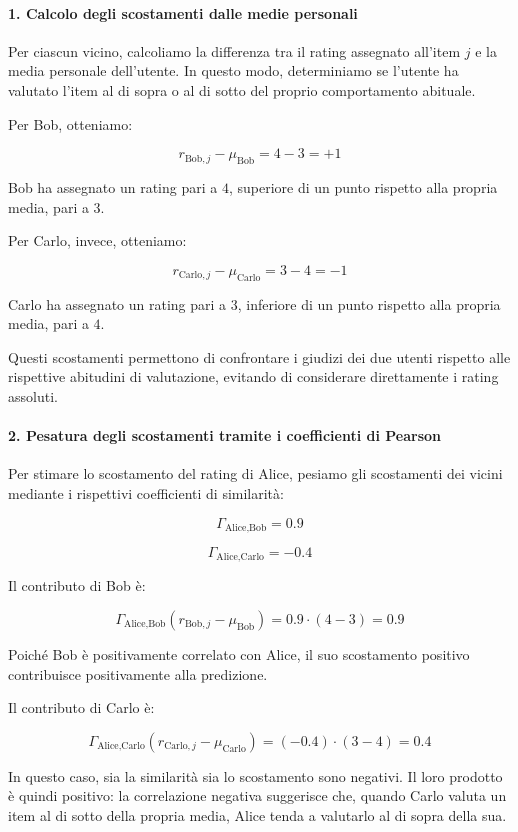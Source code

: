 \paragraph{1. Calcolo degli scostamenti dalle medie personali}

Per ciascun vicino, calcoliamo la differenza tra il rating assegnato all'item $j$ e la media personale dell'utente. In questo modo, determiniamo se l'utente ha valutato l'item al di sopra o al di sotto del proprio comportamento abituale.

Per Bob, otteniamo:

\[
r_{\text{Bob},j}-\mu_{\text{Bob}}=4-3=+1
\]

Bob ha assegnato un rating pari a $4$, superiore di un punto rispetto alla propria media, pari a $3$.

Per Carlo, invece, otteniamo:

\[
r_{\text{Carlo},j}-\mu_{\text{Carlo}}=3-4=-1
\]

Carlo ha assegnato un rating pari a $3$, inferiore di un punto rispetto alla propria media, pari a $4$.

Questi scostamenti permettono di confrontare i giudizi dei due utenti rispetto alle rispettive abitudini di valutazione, evitando di considerare direttamente i rating assoluti.

\paragraph{2. Pesatura degli scostamenti tramite i coefficienti di Pearson}

Per stimare lo scostamento del rating di Alice, pesiamo gli scostamenti dei vicini mediante i rispettivi coefficienti di similarità:

\[
\Gamma_{\text{Alice,Bob}}=0.9
\]

\[
\Gamma_{\text{Alice,Carlo}}=-0.4
\]

Il contributo di Bob è:

\[
\Gamma_{\text{Alice,Bob}}
(r_{\text{Bob},j}-\mu_{\text{Bob}})
=0.9\cdot(4-3)=0.9
\]

Poiché Bob è positivamente correlato con Alice, il suo scostamento positivo contribuisce positivamente alla predizione.

Il contributo di Carlo è:

\[
\Gamma_{\text{Alice,Carlo}}
(r_{\text{Carlo},j}-\mu_{\text{Carlo}})
=(-0.4)\cdot(3-4)=0.4
\]

In questo caso, sia la similarità sia lo scostamento sono negativi. Il loro prodotto è quindi positivo: la correlazione negativa suggerisce che, quando Carlo valuta un item al di sotto della propria media, Alice tenda a valutarlo al di sopra della sua.

